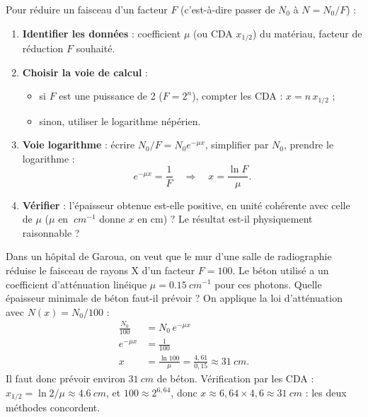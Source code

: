 \documentclass[11pt]{article}
\begin{document}
\begin{methode}
Pour réduire un faisceau d'un facteur $F$ (c'est-à-dire passer de $N_{0}$ à $N = N_{0}/F$) :
\begin{enumerate}
\item \textbf{Identifier les données} : coefficient $\mu$ (ou CDA $x_{1/2}$) du matériau, facteur de réduction $F$ souhaité.
\item \textbf{Choisir la voie de calcul} :
  \begin{itemize}
  \item si $F$ est une puissance de 2 ($F = 2^{n}$), compter les CDA : $x = n\,x_{1/2}$ ;
  \item sinon, utiliser le logarithme népérien.
  \end{itemize}
\item \textbf{Voie logarithme} : écrire $N_{0}/F = N_{0}e^{-\mu x}$, simplifier par $N_{0}$, prendre le logarithme :
  \[ e^{-\mu x} = \frac{1}{F} \quad\Longrightarrow\quad x = \frac{\ln F}{\mu}. \]
\item \textbf{Vérifier} : l'épaisseur obtenue est-elle positive, en unité cohérente avec celle de $\mu$ ($\mu$ en $\SI{}{cm^{-1}}$ donne $x$ en cm) ? Le résultat est-il physiquement raisonnable ?
\end{enumerate}
\end{methode}

\begin{exoresolu}
Dans un hôpital de Garoua, on veut que le mur d'une salle de radiographie réduise le faisceau de rayons X d'un facteur $F = 100$. Le béton utilisé a un coefficient d'atténuation linéique $\mu = \SI{0,15}{cm^{-1}}$ pour ces photons. Quelle épaisseur minimale de béton faut-il prévoir ?
\tcblower
On applique la loi d'atténuation avec $N(x) = N_{0}/100$ :
\begin{align*}
\frac{N_{0}}{100} &= N_{0}\,e^{-\mu x} \\
e^{-\mu x} &= \frac{1}{100} \\
x &= \frac{\ln 100}{\mu} = \frac{4{,}61}{0{,}15} \approx \SI{31}{cm}.
\end{align*}
Il faut donc prévoir environ $\SI{31}{cm}$ de béton. Vérification par les CDA : $x_{1/2} = \ln 2/\mu \approx \SI{4,6}{cm}$, et $100 \approx 2^{6{,}64}$, donc $x \approx 6{,}64\times 4{,}6 \approx \SI{31}{cm}$ : les deux méthodes concordent.
\end{exoresolu}
\end{document}
